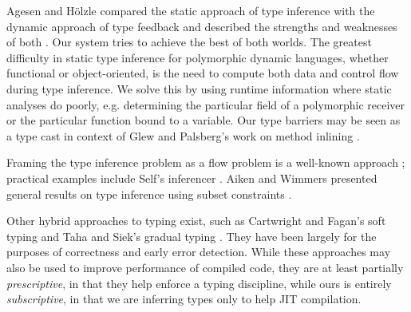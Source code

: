 Agesen and H\"olzle compared the static approach of type inference with the
dynamic approach of type feedback and described the strengths and weaknesses
of both \cite{Agesen95}. Our system tries to achieve the best of both
worlds. The greatest difficulty in static type inference for polymorphic
dynamic languages, whether functional or object-oriented, is the need to
compute both data and control flow during type inference. We solve this by
using runtime information where static analyses do poorly,
e.g. determining the particular field of a polymorphic receiver or the
particular function bound to a variable. Our type barriers may be seen as a
type cast in context of Glew and
Palsberg's work on method inlining \cite{Glew02}.

Framing the type inference problem as a flow problem is a well-known approach
\cite{Oxhoj92, Palsberg91}; practical examples include Self's inferencer
\cite{Agesen93TI}.
Aiken and Wimmers presented general results on
type inference using subset constraints \cite{Aiken93}.


Other hybrid approaches to typing exist, such as Cartwright and Fagan's soft
typing and Taha and Siek's gradual typing \cite{Cartwright91, Siek07}. They
have been largely for the purposes of correctness and early error
detection.
While these approaches may also be used to improve performance of
compiled code, they are at least partially \emph{prescriptive}, in that they
help enforce a typing discipline, while ours is entirely \emph{subscriptive}, in that
we are inferring types only to help JIT compilation.


